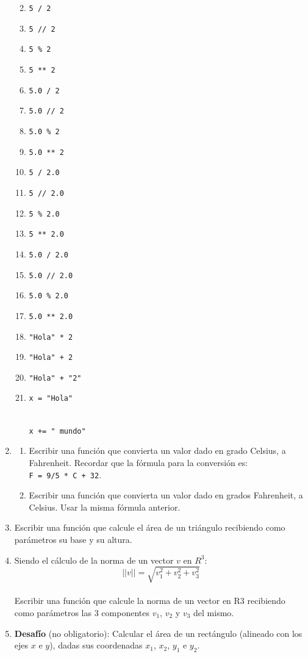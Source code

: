 \documentclass[
  letterpaper,
  DIV=11,
  numbers=noendperiod]{scrreprt}
\providecommand{\tightlist}{%
  \setlength{\itemsep}{0pt}\setlength{\parskip}{0pt}}\usepackage{longtable,booktabs,array}
\begin{document}
\begin{enumerate}
  \begin{enumerate}
  \def\labelenumii{\alph{enumii}.}
  \tightlist
  \item
    \texttt{5\ /\ 2}
  \item
    \texttt{5\ //\ 2}
  \item
    \texttt{5\ \%\ 2}
  \item
    \texttt{5\ **\ 2}
  \item
    \texttt{5.0\ /\ 2}
  \item
    \texttt{5.0\ //\ 2}
  \item
    \texttt{5.0\ \%\ 2}
  \item
    \texttt{5.0\ **\ 2}
  \item
    \texttt{5\ /\ 2.0}
  \item
    \texttt{5\ //\ 2.0}
  \item
    \texttt{5\ \%\ 2.0}
  \item
    \texttt{5\ **\ 2.0}
  \item
    \texttt{5.0\ /\ 2.0}
  \item
    \texttt{5.0\ //\ 2.0}
  \item
    \texttt{5.0\ \%\ 2.0}
  \item
    \texttt{5.0\ **\ 2.0}
  \item
    \texttt{"Hola"\ *\ 2}
  \item
    \texttt{"Hola"\ +\ 2}
  \item
    \texttt{"Hola"\ +\ "2"}
  \item
    \texttt{x\ =\ "Hola"}\strut \\
    \texttt{x\ +=\ "\ mundo"}
  \end{enumerate}
\item
  \begin{enumerate}
  \def\labelenumii{\alph{enumii}.}
  \tightlist
  \item
    Escribir una función que convierta un valor dado en grado Celsius, a
    Fahrenheit. Recordar que la fórmula para la conversión es:
    \texttt{F\ =\ 9/5\ *\ C\ +\ 32}.
  \item
    Escribir una función que convierta un valor dado en grados
    Fahrenheit, a Celsius. Usar la misma fórmula anterior.
  \end{enumerate}
\item
  Escribir una función que calcule el área de un triángulo recibiendo
  como parámetros su base y su altura.
\item
  Siendo el cálculo de la norma de un vector \(v\) en \(R^3\):\\
  \[||v|| = \sqrt{v_1^2 + v_2^2 + v_3^2}\]\\
  Escribir una función que calcule la norma de un vector en R3
  recibiendo como parámetros las 3 componentes \(v_1\), \(v_2\) y
  \(v_3\) del mismo.
\item
  \textbf{Desafío} (no obligatorio): Calcular el área de un rectángulo
  (alineado con los ejes \(x\) e \(y\)), dadas sus coordenadas \(x_1\),
  \(x_2\), \(y_1\) e \(y_2\).
\end{enumerate}
\end{document}
